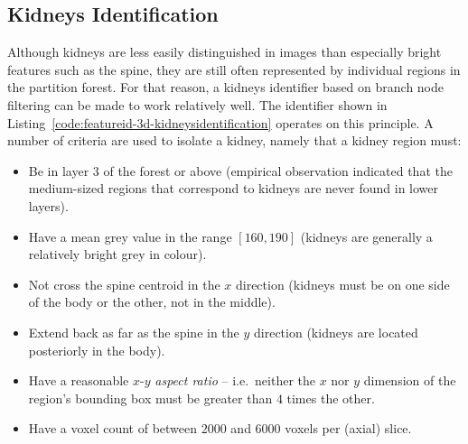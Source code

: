 \afterpage{\clearpage}
\newpage

\subsection{Kidneys Identification}



\vspace{-5mm}

\noindent Although kidneys are less easily distinguished in images than especially bright features such as the spine, they are still often represented by individual regions in the partition forest. For that reason, a kidneys identifier based on branch node filtering can be made to work relatively well. The identifier shown in Listing~\ref{code:featureid-3d-kidneysidentification} operates on this principle. A number of criteria are used to isolate a kidney, namely that a kidney region must:
%
\begin{itemize}
\item Be in layer $3$ of the forest or above (empirical observation indicated that the medium-sized regions that correspond to kidneys are never found in lower layers).
\item Have a mean grey value in the range $[160,190]$ (kidneys are generally a relatively bright grey in colour).
\item Not cross the spine centroid in the $x$ direction (kidneys must be on one side of the body or the other, not in the middle).
\item Extend back as far as the spine in the $y$ direction (kidneys are located posteriorly in the body).
\item Have a reasonable $x$-$y$ \emph{aspect ratio} -- i.e.~neither the $x$ nor $y$ dimension of the region's bounding box must be greater than $4$ times the other.
\item Have a voxel count of between $2000$ and $6000$ voxels per (axial) slice.
\end{itemize}
%

